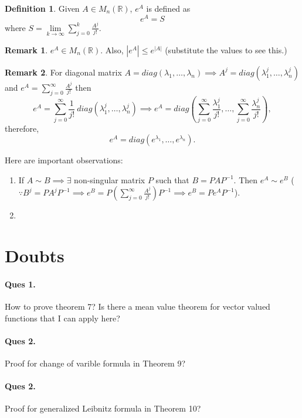 \documentclass[12pt,reqno]{amsart}
\theoremstyle{plain}
\theoremstyle{definition}
\newtheorem{defn}{Definition}
\newtheorem{rem}{Remark}
\begin{document}
\begin{defn}
    Given $A \in M_n(\mathbb{R})$, $e^A$ is defined as
    $$ e^A = S$$ where $S = \lim\limits_{k \to \infty} \sum\limits_{j = 0}^k \frac{A^j}{j!}.$
\end{defn}
\begin{rem}
    $e^A \in M_n(\mathbb{R})$. Also, $|e^A| \leq e^{|A|}$ (substitute the values to see this.)
\end{rem}
\begin{rem}
    For diagonal matrix $A = diag(\lambda_1, \dots, \lambda_n) \implies A^j = diag(\lambda_1^j, \dots, \lambda_n^j)$ and $e^A = \sum\limits_{j=0}^{\infty}\frac{A^j}{j!}$ then 
    $$e^A = \sum\limits_{j=0}^{\infty}\frac{1}{j!}~diag(\lambda_1^j, \dots, \lambda_n^j) \implies e^A = diag(\sum\limits_{j=0}^{\infty}\frac{\lambda_1^j}{j!}, \dots, \sum\limits_{j=0}^{\infty}\frac{\lambda_n^j}{j!}),$$ therefore, 
    $$e^A = diag(e^{\lambda_1}, \dots, e^{\lambda_n}).$$
\end{rem}
Here are important observations:
\begin{enumerate}
    \item If $A \sim B \implies \exists$ non-singular matrix $P$ such that $B = PAP^{-1}$. Then $e^A \sim e^B$ ($\because B^j = PA^jP^{-1} \implies e^B = P\left(\sum\limits_{j=0}^{\infty}\frac{A^j}{j!}\right) P^{-1} \implies e^B = Pe^AP^{-1}$).
    \item 
\end{enumerate}
\section{Doubts}
\paragraph{\bf Ques 1.} How to prove theorem 7? Is there a mean value theorem for vector valued functions that I can apply here?
\paragraph{\bf Ques 2.} Proof for change of varible formula in Theorem 9?
\paragraph{\bf Ques 2.} Proof for generalized Leibnitz formula in Theorem 10?
\end{document}
